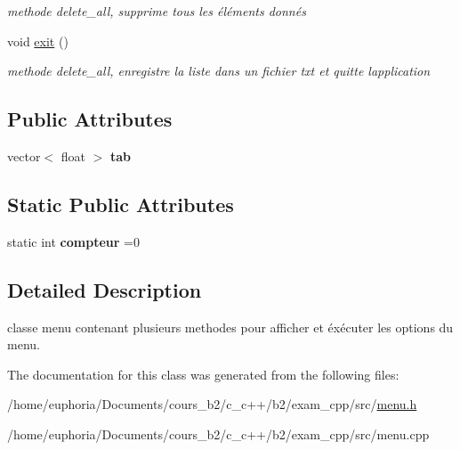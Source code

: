 \begin{DoxyCompactItemize}
\begin{DoxyCompactList}\small\item\em methode delete\+\_\+all, supprime tous les éléments donnés \end{DoxyCompactList}\item 
void \hyperlink{classmenu_aa1c97c7187ff0fd1744fcd2e42c3910c}{exit} ()\hypertarget{classmenu_aa1c97c7187ff0fd1744fcd2e42c3910c}{}\label{classmenu_aa1c97c7187ff0fd1744fcd2e42c3910c}

\begin{DoxyCompactList}\small\item\em methode delete\+\_\+all, enregistre la liste dans un fichier txt et quitte l\textquotesingle{}application \end{DoxyCompactList}\end{DoxyCompactItemize}
\subsection*{Public Attributes}
\begin{DoxyCompactItemize}
\item 
vector$<$ float $>$ {\bfseries tab}\hypertarget{classmenu_a9482736291bba796d0daecdc91ef21c8}{}\label{classmenu_a9482736291bba796d0daecdc91ef21c8}

\end{DoxyCompactItemize}
\subsection*{Static Public Attributes}
\begin{DoxyCompactItemize}
\item 
static int {\bfseries compteur} =0\hypertarget{classmenu_a8fc38c22ece04ea5f34301b225d66644}{}\label{classmenu_a8fc38c22ece04ea5f34301b225d66644}

\end{DoxyCompactItemize}


\subsection{Detailed Description}
classe menu contenant plusieurs methodes pour afficher et éxécuter les options du menu. 

The documentation for this class was generated from the following files\+:\begin{DoxyCompactItemize}
\item 
/home/euphoria/\+Documents/cours\+\_\+b2/c\+\_\+c++/b2/exam\+\_\+cpp/src/\hyperlink{menu_8h}{menu.\+h}\item 
/home/euphoria/\+Documents/cours\+\_\+b2/c\+\_\+c++/b2/exam\+\_\+cpp/src/menu.\+cpp\end{DoxyCompactItemize}
